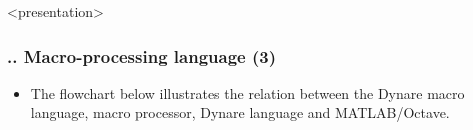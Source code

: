 \documentclass[11pt,aspectratio=169]{beamer}
\begin{document}
\begin{frame}<presentation>
	\frametitle{{\thesection.\thesubsection.\thesubsubsection} Macro-processing language (3)}
	\begin{itemize}
		\justifying
		\item The flowchart below illustrates the relation between the Dynare macro language, macro processor, Dynare language and MATLAB/Octave.
		\begin{figure}
			\centering
		\end{figure}
	\end{itemize}
\end{frame}
\end{document}
